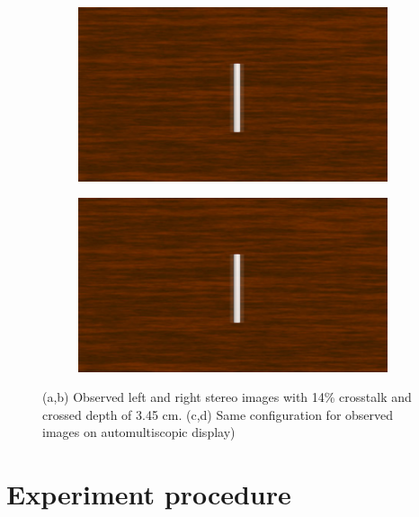 \begin{figure}[htbp]
    \begin{subfigure}[b]{0.5\textwidth}
        \includegraphics[width=\textwidth]{./Template_Figures/auto_ghost_left}
        \caption{}\label{fig:obs_aut_left}
    \end{subfigure}
    \begin{subfigure}[b]{0.5\textwidth}
        \includegraphics[width=\textwidth]{./Template_Figures/auto_ghost_left}
        \caption{}\label{fig:obs_aut_right}
    \end{subfigure}
    \caption{(a,b) Observed left and right stereo images with 14\% crosstalk and crossed depth of 3.45 cm. (c,d) Same configuration for observed images on automultiscopic display)\label{fig:observed_ct_images}}
\end{figure}

\section{Experiment procedure}
